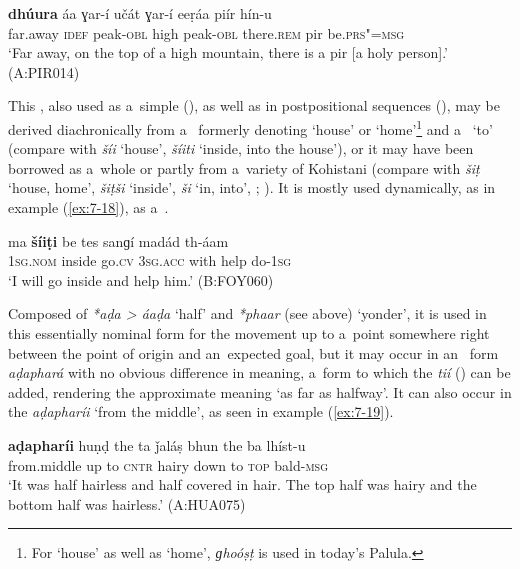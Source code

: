 \begin{exe}
\ex
\label{ex:7-17b}
\gll \textbf{dhúura} áa ɣar-í učát ɣar-í eeṛáa piír hín-u \\
far.away \textsc{idef} peak-\textsc{obl} high peak-\textsc{obl} there.\textsc{rem} pir be.\textsc{prs"=msg}\\
\glt `Far away, on the top of a high mountain, there is a pir [a holy person].' (A:PIR014)
\end{exe}


 This , also used as a~simple 
(), as well as in postpositional sequences (), may be derived diachronically from
a~ formerly denoting `house' or `home'\footnote{For `house' as well as `home',
  \textit{ɡhoóṣṭ} is used in today's Palula.} and a~ `to' (compare with \iliKalkoti
\textit{šíi} `house', \textit{šíiti} `inside, into the house'), or it may have been borrowed
as a~whole or partly from a~variety of Kohistani (compare with \iliGawri \textit{šiṭ} `house, home',
\textit{šiṭši} `inside', \textit{ši} `in, into', \citealt[119]{baart1997}; \citeyear[76]{baart1999a}). It is mostly used
dynamically, as in example (\ref{ex:7-18}), as a~.

\begin{exe}
\ex
\label{ex:7-18}
\gll ma \textbf{šíiṭi} be tes sanɡí madád th-áam \\
\textsc{1sg.nom} inside go.\textsc{cv} \textsc{3sg.acc} with help do-\textsc{1sg}\\
\glt `I will go inside and help him.' (B:FOY060)
\end{exe}

 Composed of \textit{*aḍa {\textgreater} áaḍa} `half' and \textit{*phaar} (see above) `yonder', it is used in this essentially nominal form for the movement up to a~point somewhere right between the point of origin and an~expected goal, but it may occur in an~ form \textit{aḍaphará} with no obvious difference in meaning, a~form to which the  \textit{tií} () can be added, rendering the approximate meaning `as far as halfway'. It can also occur in the  \textit{aḍapharíi} `from the middle', as seen in example (\ref{ex:7-19}). 
\begin{exe}
\ex
\label{ex:7-19}
\gll \textbf{aḍapharíi} huṇḍ the ta ǰaláṣ bhun the ba lhíst-u \\
from.middle up to \textsc{cntr} hairy down to \textsc{top} bald-\textsc{msg}\\
\glt `It was half hairless and half covered in hair. The top half was hairy and the bottom half was hairless.' (A:HUA075)
\end{exe}

